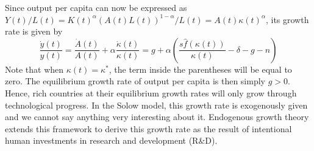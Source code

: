 \documentclass[\topdir/lecture\_notes.tex]{subfiles}
\begin{document}
Since output per capita can now be expressed as $Y(t) / L(t)=K(t)^{\alpha}(A(t) L(t))^{1-\alpha} / L(t)=A(t) \kappa(t)^{\alpha}$, its growth rate is given by
\begin{equation}
  \frac{\dot{y}(t)}{y(t)}=\frac{\dot{A}(t)}{A(t)}+\alpha \frac{\dot{\kappa}(t)}{\kappa(t)}=g+\alpha\left(\frac{s \hat{f}(\kappa(t))}{\kappa(t)}-\delta-g-n\right)
  \label{eq:solow-output-growth-tech}
\end{equation}
Note that when $\kappa(t)=\kappa^{*}$, the term inside the parentheses will be equal to zero.
The equilibrium growth rate of output per capita is then simply $g>0$.
Hence, rich countries at their equilibrium growth rates will only grow through technological progress.
In the Solow model, this growth rate is exogenously given and we cannot say anything very interesting about it.
Endogenous growth theory extends this framework to derive this growth rate as the result of intentional human investments in research and development (R\&D).


  
  
  
  
  
\end{document}
